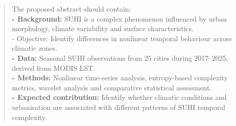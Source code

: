 \begin{abstract}
The proposed abstract should contain:\\%
\textbf{- Background:} SUHI is a complex phenomenon influenced by urban morphology, climate variability and surface characteristics.\\%
- Objective: Identify differences in nonlinear temporal behaviour across climatic zones.\\%
\textbf{- Data:} Seasonal SUHI observations from 25 cities during 2017–2025, derived from MODIS LST.\\%
\textbf{- Methods: }Nonlinear time-series analysis, entropy-based complexity metrics, wavelet analysis and comparative statistical assessment.\\%
\textbf{- Expected contribution:} Identify whether climatic conditions and urbanisation are associated with different patterns of SUHI temporal complexity.
\end{abstract}
\keywords{\mykeywords}